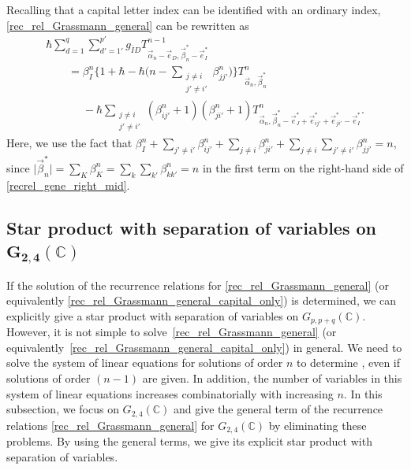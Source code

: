 \documentclass[10pt,a4paper]{amsart}
\numberwithin{equation}{section}
\begin{document}
Recalling that a capital letter index can be identified with an ordinary index, \eqref{rec_rel_Grassmann_general} can be rewritten as
\begin{gather}
 \hbar
 \sum_{d=1}^{q}
 \sum_{d'=1'}^{p'}
 g_{\overline{I}D}
 T^{n-1}_{\vec{\alpha}_{n}-\vec{e}_{D},\vec{\beta}_{n}^{\ast}-\vec{e}_{I}^{\ast}}
\nonumber
 \\
 \qquad=
 \beta_{I}^{n}
 \Biggl\{
 1
 +
 \hbar
 -
 \hbar
 \biggl(
 n
 -
 \sum_{
 \substack{
 j
 \neq
 i
 \\
 j'
 \neq
 i'}
 }
 \beta_{jj'}^{n}
 \biggr)
 \Biggr\}
 T^{n}_{\vec{\alpha}_{n},\vec{\beta}_{n}^{\ast}}\nonumber\\
 \phantom{ \qquad=}{}
 -
 \hbar
 \sum_{
 \substack{
 j
 \neq
 i
 \\
 j'
 \neq
 i'}
 }
 (
 \beta_{ij'}^{n}
 +
 1
 )
 (
 \beta_{ji'}^{n}
 +
 1
 )
 T^{n}_{\vec{\alpha}_{n},\vec{\beta}_{n}^{\ast}-\vec{e}_{J}^{\ast}
 +\vec{e}_{ij'}^{\ast}+\vec{e}_{ji'}^{\ast}-\vec{e}_{I}^{\ast}}.
 \label{rec_rel_Grassmann_general_capital_only}
\end{gather}
Here, we use the fact that
$
 \beta_{I}^{n}
 +
 \sum_{
 j'
 \neq
 i'
 }
 \beta_{ij'}^{n}
 +
 \sum_{
 j
 \neq
 i
 }
 \beta_{ji'}^{n}
 +
 \sum_{
 j
 \neq
 i
 }
 \sum_{
 j'
 \neq
 i'
 }
 \beta_{jj'}^{n}
 =
 n$,
since
$
\big|
\vec{\beta}_{n}^{\ast}
\big|
=
\sum_{K}
\beta_{K}^{n}
=
\sum_{k}
\sum_{k'}
\beta_{kk'}^{n}
=
n
$
in the first term on the right-hand side of \eqref{recrel_gene_right_mid}.

\subsection[Star product with separation of variables on G\_\{2,4\}(C)]{Star product with separation of variables on $\boldsymbol{G_{2,4}(\mathbb{C})}$}
\label{G24_star_prd}

If the solution of the recurrence relations for \eqref{rec_rel_Grassmann_general} (or equivalently \eqref{rec_rel_Grassmann_general_capital_only}) is determined, we can explicitly give a star product with separation of variables on
$ G_{p,p+q}(\mathbb{C})$.
However, it is not simple to solve~\eqref{rec_rel_Grassmann_general} (or equivalently~\eqref{rec_rel_Grassmann_general_capital_only}) in general. We need to solve the system of linear equations for solutions of order $n$ to determine , even if solutions of order $(n-1)$ are given. In addition, the number of variables in this system of linear equations increases combinatorially with increasing $n$. In this subsection, we focus on $G_{2,4}(\mathbb{C})$ and give the general term of the recurrence relations \eqref{rec_rel_Grassmann_general} for $G_{2,4}(\mathbb{C})$ by eliminating these problems. By using the general terms, we give its explicit star product with separation of variables.
\end{document}
